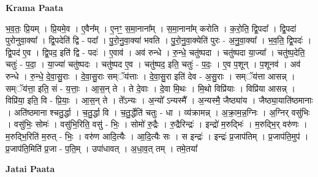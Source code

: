 \documentclass[17pt]{extarticle}
\begin{document}
\textbf{Krama Paata} \newline

भ॒व॒तः॒ प्रि॒यम् । प्रि॒यमे॒व । ए॒वैन᳚म् । ए॒नꣳ॒॒ स॒मा॒नाना᳚म् । स॒मा॒नाना᳚म् करोति । क॒रो॒ति॒ द्वि॒पदा᳚ । द्वि॒पदा॑ पुरोनुवा॒क्या᳚ । द्वि॒पदेति॑ द्वि - पदा᳚ । पु॒रो॒नु॒वा॒क्या॑ भवति । पु॒रो॒नु॒वा॒क्येति॑ पुरः - अ॒नु॒वा॒क्या᳚ । भ॒व॒ति॒ द्वि॒पदः॑ । द्वि॒पद॑ ए॒व । द्वि॒पद॒ इति॑ द्वि - पदः॑ । ए॒वाव॑ । अव॑ रुन्धे । रु॒न्धे॒ चतु॑ष्पदा । चतु॑ष्पदा या॒ज्या᳚ । चतु॑ष्प॒देति॒ चतुः॑ - प॒दा॒ । या॒ज्या॑ चतु॑ष्पदः । चतु॑ष्पद ए॒व । चतु॑ष्पद॒ इति॒ चतुः॑ - प॒दः॒ । ए॒व प॒शून् । प॒शूनव॑ । अव॑ रुन्धे । रु॒न्धे॒ दे॒वा॒सु॒राः । दे॒वा॒सु॒राः सम्ॅय॑त्ताः । दे॒वा॒सु॒रा इति॑ देव - अ॒सु॒राः । सम्ॅय॑त्ता आसन्न् । सम्ॅय॑त्ता॒ इति॒ सं - य॒त्ताः॒ । आ॒स॒न् ते । ते दे॒वाः । दे॒वा मि॒थः । मि॒थो विप्रि॑याः । विप्रि॑या आसन्न् । विप्रि॑या॒ इति॒ वि - प्रि॒याः॒ । आ॒स॒न् ते । ते᳚ऽन्यः । अ॒न्यो᳚ ऽन्यस्मै᳚ । अ॒न्यस्मै॒ जैष्ठ्या॑य । जैष्ठ्या॒याति॑ष्ठमानाः । अति॑ष्ठमाना श्चतु॒र्द्धा । च॒तु॒र्द्धा वि । च॒तु॒र्द्धेति॑ चतुः - धा । व्य॑क्रामन्न् । अ॒क्रा॒म॒न्न॒ग्निः । अ॒ग्निर् वसु॑भिः । वसु॑भिः॒ सोमः॑ । वसु॑भि॒रिति॒ वसु॑ - भिः॒ । सोमो॑ रु॒द्रैः । रु॒द्रैरिन्द्रः॑ । इन्द्रो॑ म॒रुद्भिः॑ । म॒रुद्भि॒र् वरु॑णः । म॒रुद्भि॒रिति॑ म॒रुत् - भिः॒ । वरु॑ण आदि॒त्यैः । आ॒दि॒त्यैः सः । स इन्द्रः॑ । इन्द्रः॑ प्र॒जाप॑तिम् । प्र॒जाप॑ति॒मुप॑ । प्र॒जाप॑ति॒मिति॑ प्र॒जा - प॒ति॒म् । उपा॑धावत् । अ॒धा॒व॒त् तम् । तमे॒तया᳚ \newline

\textbf{Jatai Paata} \newline
\end{document}
